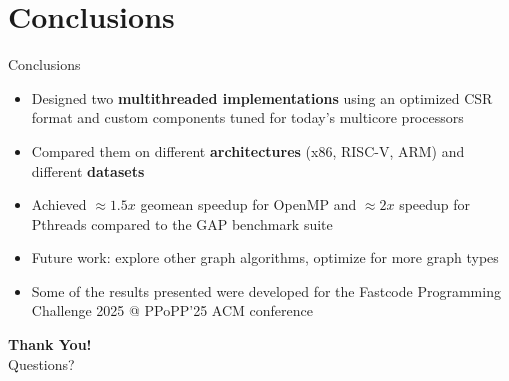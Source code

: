 \section{Conclusions}
\begin{frame}{Conclusions}
\begin{itemize}
  \item Designed two \textbf{multithreaded implementations} using an optimized CSR format and custom components tuned for today’s multicore processors
  \item Compared them on different \textbf{architectures} (x86, RISC-V, ARM) and different \textbf{datasets}
  \item Achieved $\approx 1.5x$ geomean speedup for OpenMP and $\approx 2x$ speedup for Pthreads compared to the GAP benchmark suite
  \item Future work: explore other graph algorithms, optimize for more graph types
  \item Some of the results presented were developed for the Fastcode Programming Challenge 2025 @ PPoPP'25 ACM conference 
\end{itemize}
\vspace{4mm}
\end{frame}

\begin{frame}[plain]
  \advance\textwidth2cm
  \hsize\textwidth
  \columnwidth\textwidth
  \centering
  \Huge \textbf{\alert{Thank You!}} \\[1em]
  \Large Questions?
\end{frame}